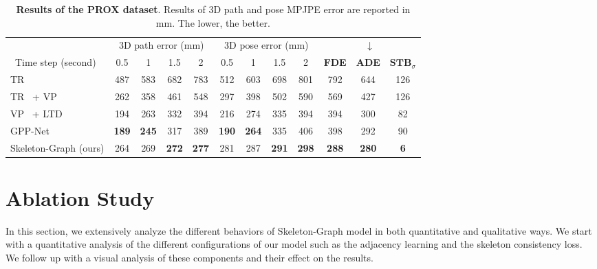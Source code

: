 \documentclass[10pt,twocolumn,letterpaper]{article}
\newcommand*{\ours}{Skeleton-Graph }
\begin{document}
\begin{table*}[ht]
\centering
\scriptsize
\begin{tabular}{lccccccccccc} 
\toprule
                       & \multicolumn{4}{c}{3D path error (mm)}                    & \multicolumn{4}{c}{3D pose error (mm)} & \multicolumn{3}{c}{$\downarrow$}                                                 \\
~Time step (second)    & 0.5          & 1            & 1.5          & 2            & 0.5          & 1            & 1.5          & 2            & \textbf{FDE}  & \textbf{ADE} &   $\textbf{STB}_{\sigma} $  \\ 
\midrule
TR~\cite{vaswani2017attention}                        & 487          & 583          & 682          & 783          & 512          & 603          & 698          & 801          & 792  &644    &126                  \\
TR~\cite{vaswani2017attention} + VP~\cite{pavllo20193d}                & 262          & 358          & 461          & 548          & 297          & 398          & 502          & 590          & 569   &427      &126               \\
VP~\cite{pavllo20193d} + LTD~\cite{wei2019motion}              & 194          & 263          & 332          & 394          & 216          & 274          & 335          & 394 & 394    &300   &82                 \\
GPP-Net~\cite{cao2020long}                 & \textbf{189} & \textbf{245} & 317 & 389 & \textbf{190} & \textbf{264} & 335 & 406          & 398  &292  &90           \\ 
\midrule
\ours (ours) & 264          & 269          & \textbf{272}          & \textbf{277}          & 281          & 287          & \textbf{291}          & \textbf{298}          & \textbf{288}  &\textbf{280}  &\textbf{6}                    \\
\bottomrule
\end{tabular}
\caption{  {\bf Results of the PROX dataset}. Results of 3D path and pose MPJPE error are reported in mm. The lower, the better. }
\label{tab:prox_all}
\end{table*}
\section{Ablation Study}
In this section, we extensively analyze the different behaviors of \ours model in both quantitative and qualitative ways. We start with a quantitative analysis of the different configurations of our model such as the adjacency learning and the skeleton consistency loss. We follow up with a visual analysis of these components and their effect on the results.
\end{document}
